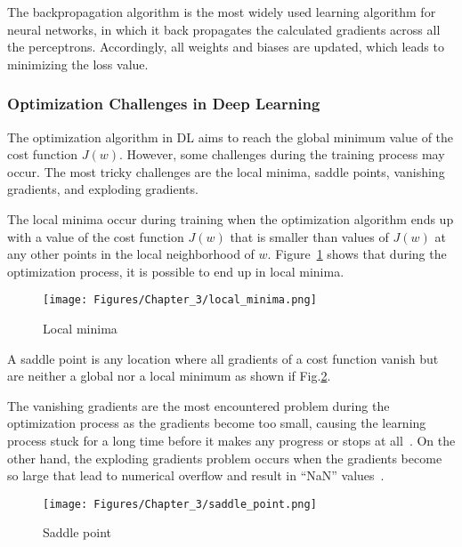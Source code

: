 The backpropagation algorithm is the most widely used learning algorithm for neural networks, in which it back propagates the calculated gradients across all the perceptrons.
Accordingly, all weights and biases are updated, which leads to minimizing the loss value.
\subsubsection{Optimization Challenges in Deep Learning}
The optimization algorithm in DL aims to reach the global minimum value of the cost function \(J(w)\).
However, some challenges during the training process may occur.
The most tricky challenges are the local minima, saddle points, vanishing gradients, and exploding gradients.

The local minima occur during training when the optimization algorithm ends up with a value of the cost function \(J(w)\) that is smaller than values of \(J(w)\) at any other points in the local neighborhood of \(w\).
Figure~\ref{fig:local_minima} shows that during the optimization process, it is possible to end up in local minima.
\begin{figure}[!ht]
	\begin{center}
		\centering
		\texttt{[image: Figures/Chapter\_3/local\_minima.png]}
	\end{center}
	\caption{Local minima} 
	\label{fig:local_minima}
\end{figure}

A saddle point is any location where all gradients of a cost function vanish but are neither a global nor a local minimum as shown if Fig.\ref{fig:saddle_point}.

The vanishing gradients are the most encountered problem during the optimization process as the gradients become too small, causing the learning process stuck for a long time before it makes any progress or stops at all~\cite{Brownlee2017a}.
On the other hand, the exploding gradients problem occurs when the gradients become so large that lead to numerical overflow and result in \enquote{NaN} values~\cite{Brownlee2017a}.
\begin{figure}[!ht]
	\begin{center}
		\centering
		\texttt{[image: Figures/Chapter\_3/saddle\_point.png]}
	\end{center}
	\caption{Saddle point} 
	\label{fig:saddle_point}
\end{figure}
